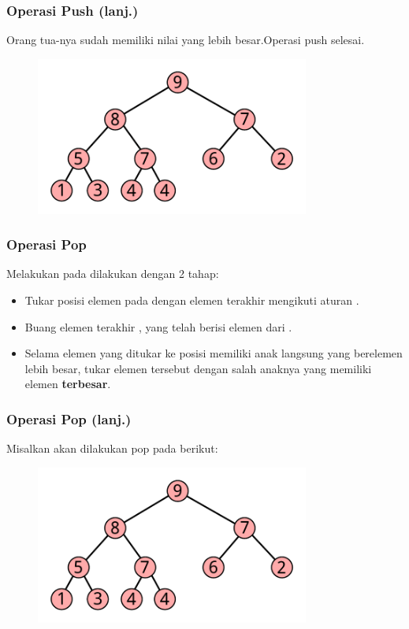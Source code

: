 \begin{frame}
\frametitle{Operasi Push (lanj.)}
Orang tua-nya sudah memiliki nilai yang lebih besar.\newline Operasi push selesai.
\begin{figure}
  \includegraphics[width=9cm]{asset/push-4.pdf}
\end{figure}
\end{frame}


\begin{frame}
\frametitle{Operasi Pop}
Melakukan  pada \pbinaryHeap dilakukan dengan 2 tahap:
\begin{itemize}
  \item Tukar posisi elemen pada  dengan elemen terakhir mengikuti aturan .
  \item Buang elemen terakhir \pbinaryHeap, yang telah berisi elemen dari .
  \item Selama elemen yang ditukar ke posisi  memiliki anak langsung yang berelemen lebih besar, tukar elemen tersebut dengan salah anaknya yang memiliki elemen \textbf{terbesar}. 
\end{itemize}
\end{frame}

\begin{frame}
\frametitle{Operasi Pop (lanj.)}
Misalkan akan dilakukan pop pada \pheap berikut:
\begin{figure}
  \includegraphics[width=9cm]{asset/pop-1.pdf}
\end{figure}
\end{frame}

